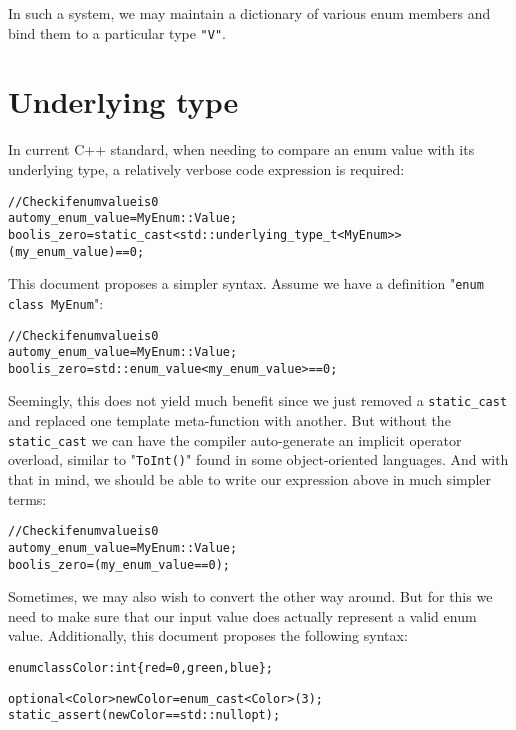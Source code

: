 \documentclass[a4paper, 12pt]{article}
\begin{document}
In such a system, we may maintain a dictionary of various enum members and bind
them to a particular type \texttt{"V"}.

\section{Underlying type}

In current C++ standard, when needing to compare an enum value with its
underlying type, a relatively verbose code expression is required:

\begin{alltt}\footnotesize
// Check if enum value is 0
auto my\_enum\_value = MyEnum::Value;
bool is\_zero = static\_cast<std::underlying\_type\_t<MyEnum>>(my\_enum\_value) == 0;
\end{alltt}

\noindent
This document proposes a simpler syntax. Assume we have a definition
"\texttt{enum class MyEnum}":

\begin{alltt}\footnotesize
// Check if enum value is 0
auto my\_enum\_value = MyEnum::Value;
bool is\_zero = std::enum\_value<my\_enum\_value> == 0;
\end{alltt}

\noindent
Seemingly, this does not yield much benefit since we just removed a
\texttt{static\_cast} and replaced one template meta-function with another.
But without the \texttt{static\_cast} we can have the compiler auto-generate
an implicit operator overload, similar to "\texttt{ToInt()}" found in some
object-oriented languages. And with that in mind, we should be able to write
our expression above in much simpler terms:

\begin{alltt}\footnotesize
// Check if enum value is 0
auto my\_enum\_value = MyEnum::Value;
bool is\_zero = (my\_enum\_value == 0);
\end{alltt}

\noindent
Sometimes, we may also wish to convert the other way around. But for this
we need to make sure that our input value does actually represent a valid
enum value. Additionally, this document proposes the following syntax:

\begin{alltt}\footnotesize
enum class Color : int \{ red = 0, green, blue \};

optional<Color> newColor = enum\_cast<Color>(3);
static\_assert(newColor == std::nullopt);
\end{alltt}
\end{document}
